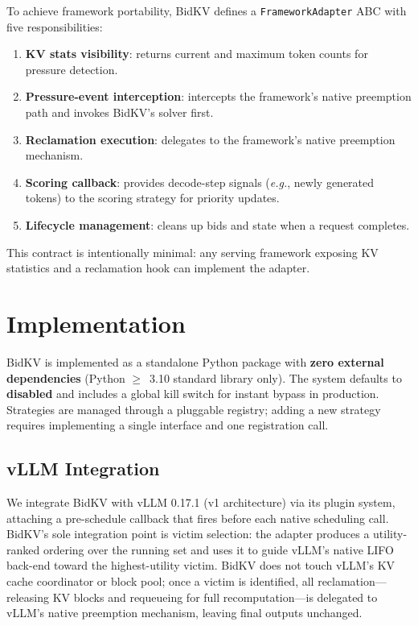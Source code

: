 \documentclass[sigconf,nonacm]{acmart}
\newcommand{\bidkv}{BidKV\xspace}
\newcommand{\eg}{\emph{e.g.},\xspace}
\begin{document}
To achieve framework portability, \bidkv defines a
\texttt{Framework\-Adapter} ABC with five responsibilities:

\begin{enumerate}[nosep]
\item \textbf{KV stats visibility}: returns current and maximum token counts
  for pressure detection.
\item \textbf{Pressure-event interception}: intercepts the framework's
  native preemption path and invokes \bidkv's solver first.
\item \textbf{Reclamation execution}: delegates to the framework's
  native preemption mechanism.
\item \textbf{Scoring callback}: provides decode-step signals (\eg newly
  generated tokens) to the scoring strategy for priority updates.
\item \textbf{Lifecycle management}: cleans up bids and state when a request
  completes.
\end{enumerate}

This contract is intentionally minimal: any serving framework exposing KV
statistics and a reclamation hook can implement the adapter.

\section{Implementation}\label{sec:impl}

\bidkv is implemented as a standalone Python package with \textbf{zero external
dependencies} (Python $\geq$~3.10 standard library only).  The system defaults to \textbf{disabled}
and includes a global kill switch for instant bypass in production.
Strategies are managed through a pluggable registry; adding a new strategy
requires implementing a single interface and one registration call.

\subsection{vLLM Integration}\label{sec:impl:vllm}

We integrate \bidkv with vLLM 0.17.1 (v1 architecture) via its plugin
system, attaching a pre-schedule callback that fires before each native
scheduling call.  \bidkv's sole integration point is victim selection: the
adapter produces a utility-ranked ordering over the running set and uses it
to guide vLLM's native LIFO back-end toward the highest-utility victim.
\bidkv does not touch vLLM's KV cache coordinator or block pool; once a
victim is identified, all reclamation---releasing KV blocks and requeueing
for full recomputation---is delegated to vLLM's native preemption mechanism,
leaving final outputs unchanged.
\end{document}
